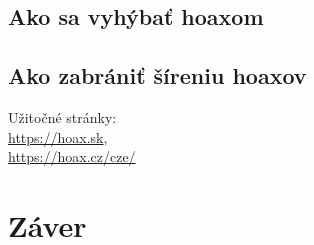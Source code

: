 \documentclass[10pt,twoside,slovak,a4paper]{article}
\begin{document}
\subsection{Ako sa vyhýbať hoaxom}
\subsection{Ako zabrániť šíreniu hoaxov}
Užitočné stránky:\\
\url{https://hoax.sk}, \\
\url{https://hoax.cz/cze/}
\section{Záver} \label{zaver}



\end{document}
